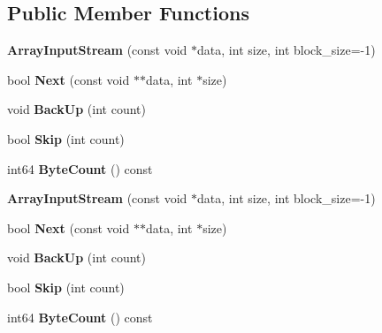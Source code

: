 \subsection*{Public Member Functions}
\begin{DoxyCompactItemize}
\item 
\mbox{\label{classgoogle_1_1protobuf_1_1io_1_1ArrayInputStream_a94c6f851da27ca1dbdf90937b8459b81}} 
{\bfseries Array\+Input\+Stream} (const void $\ast$data, int size, int block\+\_\+size=-\/1)
\item 
\mbox{\label{classgoogle_1_1protobuf_1_1io_1_1ArrayInputStream_a7b0862d17d4fa5729e1d4ef3d5651b8b}} 
bool {\bfseries Next} (const void $\ast$$\ast$data, int $\ast$size)
\item 
\mbox{\label{classgoogle_1_1protobuf_1_1io_1_1ArrayInputStream_a12628bb6761b6d24ed728aeb7e55d454}} 
void {\bfseries Back\+Up} (int count)
\item 
\mbox{\label{classgoogle_1_1protobuf_1_1io_1_1ArrayInputStream_a5b53ec138e580828111ad3127c9e5312}} 
bool {\bfseries Skip} (int count)
\item 
\mbox{\label{classgoogle_1_1protobuf_1_1io_1_1ArrayInputStream_aa64742d2d6825a538a5d3ca46586bdcc}} 
int64 {\bfseries Byte\+Count} () const
\item 
\mbox{\label{classgoogle_1_1protobuf_1_1io_1_1ArrayInputStream_a94c6f851da27ca1dbdf90937b8459b81}} 
{\bfseries Array\+Input\+Stream} (const void $\ast$data, int size, int block\+\_\+size=-\/1)
\item 
\mbox{\label{classgoogle_1_1protobuf_1_1io_1_1ArrayInputStream_a7b0862d17d4fa5729e1d4ef3d5651b8b}} 
bool {\bfseries Next} (const void $\ast$$\ast$data, int $\ast$size)
\item 
\mbox{\label{classgoogle_1_1protobuf_1_1io_1_1ArrayInputStream_a12628bb6761b6d24ed728aeb7e55d454}} 
void {\bfseries Back\+Up} (int count)
\item 
\mbox{\label{classgoogle_1_1protobuf_1_1io_1_1ArrayInputStream_a5b53ec138e580828111ad3127c9e5312}} 
bool {\bfseries Skip} (int count)
\item 
\mbox{\label{classgoogle_1_1protobuf_1_1io_1_1ArrayInputStream_aa64742d2d6825a538a5d3ca46586bdcc}} 
int64 {\bfseries Byte\+Count} () const
\end{DoxyCompactItemize}


